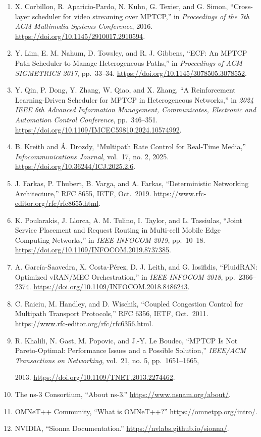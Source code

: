 \documentclass[
  american,
  11pt,
]{article}
\begin{document}
\begin{enumerate}
  2016. \url{https://doi.org/10.1109/TMC.2015.2497238}.
\item
  X. Corbillon, R. Aparicio-Pardo, N. Kuhn, G. Texier, and G. Simon,
  ``Cross-layer scheduler for video streaming over MPTCP,'' in
  \emph{Proceedings of the 7th ACM Multimedia Systems Conference}, 2016.
  \url{https://doi.org/10.1145/2910017.2910594}.
\item
  Y. Lim, E. M. Nahum, D. Towsley, and R. J. Gibbens, ``ECF: An MPTCP
  Path Scheduler to Manage Heterogeneous Paths,'' in \emph{Proceedings
  of ACM SIGMETRICS 2017}, pp.~33--34.
  \url{https://doi.org/10.1145/3078505.3078552}.
\item
  Y. Qin, P. Dong, Y. Zhang, W. Qiao, and X. Zhang, ``A Reinforcement
  Learning-Driven Scheduler for MPTCP in Heterogeneous Networks,'' in
  \emph{2024 IEEE 6th Advanced Information Management, Communicates,
  Electronic and Automation Control Conference}, pp.~346--351.
  \url{https://doi.org/10.1109/IMCEC59810.2024.10574992}.
\item
  B. Kreith and Á. Drozdy, ``Multipath Rate Control for Real-Time
  Media,'' \emph{Infocommunications Journal}, vol.~17, no. 2, 2025.
  \url{https://doi.org/10.36244/ICJ.2025.2.6}.
\item
  J. Farkas, P. Thubert, B. Varga, and A. Farkas, ``Deterministic
  Networking Architecture,'' RFC 8655, IETF, Oct.~2019.
  \url{https://www.rfc-editor.org/rfc/rfc8655.html}.
\item
  K. Poularakis, J. Llorca, A. M. Tulino, I. Taylor, and L. Tassiulas,
  ``Joint Service Placement and Request Routing in Multi-cell Mobile
  Edge Computing Networks,'' in \emph{IEEE INFOCOM 2019}, pp.~10--18.
  \url{https://doi.org/10.1109/INFOCOM.2019.8737385}.
\item
  A. García-Saavedra, X. Costa-Pérez, D. J. Leith, and G. Iosifidis,
  ``FluidRAN: Optimized vRAN/MEC Orchestration,'' in \emph{IEEE INFOCOM
  2018}, pp.~2366--2374.
  \url{https://doi.org/10.1109/INFOCOM.2018.8486243}.
\item
  C. Raiciu, M. Handley, and D. Wischik, ``Coupled Congestion Control
  for Multipath Transport Protocols,'' RFC 6356, IETF, Oct.~2011.
  \url{https://www.rfc-editor.org/rfc/rfc6356.html}.
\item
  R. Khalili, N. Gast, M. Popovic, and J.-Y. Le Boudec, ``MPTCP Is Not
  Pareto-Optimal: Performance Issues and a Possible Solution,''
  \emph{IEEE/ACM Transactions on Networking}, vol.~21, no. 5,
  pp.~1651--1665,

  2013. \url{https://doi.org/10.1109/TNET.2013.2274462}.
\item
  The ns-3 Consortium, ``About ns-3.''
  \url{https://www.nsnam.org/about/}.
\item
  OMNeT++ Community, ``What is OMNeT++?''
  \url{https://omnetpp.org/intro/}.
\item
  NVIDIA, ``Sionna Documentation.''
  \url{https://nvlabs.github.io/sionna/}.
\end{enumerate}
\end{document}
